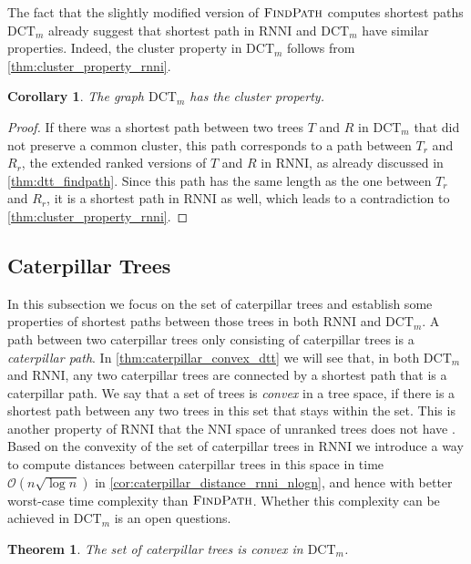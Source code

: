 \documentclass[11pt]{amsart}
\newtheorem{theorem}{Theorem}
\newtheorem{corollary}{Corollary}
\newcommand{\rnni}{\mathrm{RNNI}}
\newcommand{\findpath}{\textsc{FindPath}}
\newcommand{\nni}{\mathrm{NNI}}
\newcommand{\dtt}{\mathrm{DCT}}
\renewcommand{\O}{\mathcal O}
\newcommand{\summary}[1]{} %
\begin{document}
The fact that the slightly modified version of $\findpath$ computes shortest paths $\dtt_m$ already suggest that shortest path in $\rnni$ and $\dtt_m$ have similar properties.
Indeed, the cluster property in $\dtt_m$ follows from \autoref{thm:cluster_property_rnni}.

\begin{corollary}
	The graph $\dtt_m$ has the cluster property.
\end{corollary}

\begin{proof}
	If there was a shortest path between two trees $T$ and $R$ in $\dtt_m$ that did not preserve a common cluster, this path corresponds to a path between $T_r$ and $R_r$, the extended ranked versions of $T$ and $R$ in $\rnni$, as already discussed in \autoref{thm:dtt_findpath}.
	Since this path has the same length as the one between $T_r$ and $R_r$, it is a shortest path in $\rnni$ as well, which leads to a contradiction to \autoref{thm:cluster_property_rnni}.
\end{proof}

\subsection{Caterpillar Trees}
\label{section:caterpillar_convex}

\summary{Defining Caterpillar trees. Why are they interesting?}
In this subsection we focus on the set of caterpillar trees and establish some properties of shortest paths between those trees in both $\rnni$ and $\dtt_m$.
A path between two caterpillar trees only consisting of caterpillar trees is a \emph{caterpillar path}.
In \autoref{thm:caterpillar_convex_dtt} we will see that, in both $\dtt_m$ and $\rnni$, any two caterpillar trees are connected by a shortest path that is a caterpillar path.
We say that a set of trees is \emph{convex} in a tree space, if there is a shortest path between any two trees in this set that stays within the set.
This is another property of $\rnni$ that the $\nni$ space of unranked trees does not have \autocite{Gavryushkin2018-ol}.
Based on the convexity of the set of caterpillar trees in $\rnni$ we introduce a way to compute distances between caterpillar trees in this space in time $\O(n \sqrt{\log n})$ in \autoref{cor:caterpillar_distance_rnni_nlogn}, and hence with better worst-case time complexity than $\findpath$.
Whether this complexity can be achieved in $\dtt_m$ is an open questions.

\begin{theorem}
	The set of caterpillar trees is convex in $\dtt_m$.
	\label{thm:caterpillar_convex_dtt}
\end{theorem}
\end{document}
